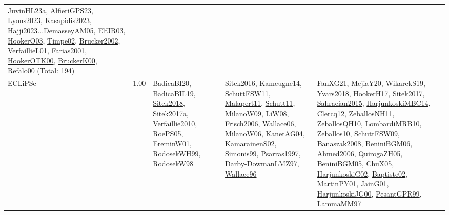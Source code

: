 {\begin{longtable}{p{3cm}r>{\raggedright\arraybackslash}p{6cm}>{\raggedright\arraybackslash}p{6cm}>{\raggedright\arraybackslash}p{8cm}}
\hyperref[detail:JuvinHL23a]{JuvinHL23a}, \hyperref[detail:AlfieriGPS23]{AlfieriGPS23}, \hyperref[detail:Lyons2023]{Lyons2023}, \hyperref[detail:Kasapidis2023]{Kasapidis2023}, \hyperref[detail:Hajji2023]{Hajji2023}...\hyperref[detail:DemasseyAM05]{DemasseyAM05}, \hyperref[detail:ElfJR03]{ElfJR03}, \hyperref[detail:HookerO03]{HookerO03}, \hyperref[detail:Timpe02]{Timpe02}, \hyperref[detail:Brucker2002]{Brucker2002}, \hyperref[detail:VerfaillieL01]{VerfaillieL01}, \hyperref[detail:Farias2001]{Farias2001}, \hyperref[detail:HookerOTK00]{HookerOTK00}, \hyperref[detail:BruckerK00]{BruckerK00}, \hyperref[detail:Refalo00]{Refalo00} (Total: 194)\\
\index{ECLiPSe}\index{CPSystems!ECLiPSe}ECLiPSe &  1.00 & \hyperref[detail:BadicaBI20]{BadicaBI20}, \hyperref[detail:BadicaBIL19]{BadicaBIL19}, \hyperref[detail:Sitek2018]{Sitek2018}, \hyperref[detail:Sitek2017a]{Sitek2017a}, \hyperref[detail:Verfaillie2010]{Verfaillie2010}, \hyperref[detail:RoePS05]{RoePS05}, \hyperref[detail:EreminW01]{EreminW01}, \hyperref[detail:RodosekWH99]{RodosekWH99}, \hyperref[detail:RodosekW98]{RodosekW98} & \hyperref[detail:Sitek2016]{Sitek2016}, \hyperref[detail:Kameugne14]{Kameugne14}, \hyperref[detail:SchuttFSW11]{SchuttFSW11}, \hyperref[detail:Malapert11]{Malapert11}, \hyperref[detail:Schutt11]{Schutt11}, \hyperref[detail:MilanoW09]{MilanoW09}, \hyperref[detail:LiW08]{LiW08}, \hyperref[detail:Frisch2006]{Frisch2006}, \hyperref[detail:Wallace06]{Wallace06}, \hyperref[detail:MilanoW06]{MilanoW06}, \hyperref[detail:KanetAG04]{KanetAG04}, \hyperref[detail:KamarainenS02]{KamarainenS02}, \hyperref[detail:Simonis99]{Simonis99}, \hyperref[detail:Psarras1997]{Psarras1997}, \hyperref[detail:Darby-DowmanLMZ97]{Darby-DowmanLMZ97}, \hyperref[detail:Wallace96]{Wallace96} & \hyperref[detail:FanXG21]{FanXG21}, \hyperref[detail:MejiaY20]{MejiaY20}, \hyperref[detail:WikarekS19]{WikarekS19}, \hyperref[detail:Yvars2018]{Yvars2018}, \hyperref[detail:HookerH17]{HookerH17}, \hyperref[detail:Sitek2017]{Sitek2017}, \hyperref[detail:Sahraeian2015]{Sahraeian2015}, \hyperref[detail:HarjunkoskiMBC14]{HarjunkoskiMBC14}, \hyperref[detail:Clercq12]{Clercq12}, \hyperref[detail:ZeballosNH11]{ZeballosNH11}, \hyperref[detail:ZeballosQH10]{ZeballosQH10}, \hyperref[detail:LombardiMRB10]{LombardiMRB10}, \hyperref[detail:Zeballos10]{Zeballos10}, \hyperref[detail:SchuttFSW09]{SchuttFSW09}, \hyperref[detail:Banaszak2008]{Banaszak2008}, \hyperref[detail:BeniniBGM06]{BeniniBGM06}, \hyperref[detail:Ahmed2006]{Ahmed2006}, \hyperref[detail:QuirogaZH05]{QuirogaZH05}, \hyperref[detail:BeniniBGM05]{BeniniBGM05}, \hyperref[detail:ChuX05]{ChuX05}, \hyperref[detail:HarjunkoskiG02]{HarjunkoskiG02}, \hyperref[detail:Baptiste02]{Baptiste02}, \hyperref[detail:MartinPY01]{MartinPY01}, \hyperref[detail:JainG01]{JainG01}, \hyperref[detail:HarjunkoskiJG00]{HarjunkoskiJG00}, \hyperref[detail:PesantGPR99]{PesantGPR99}, \hyperref[detail:LammaMM97]{LammaMM97}\\

\end{longtable}}
